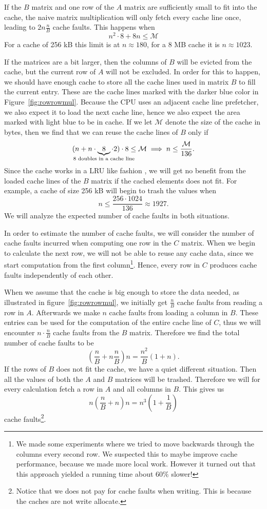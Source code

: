 If the $B$ matrix and one row of the $A$ matrix are sufficiently small
to fit into the cache, the naive matrix multiplication will only fetch
every cache line once, leading to $2n\frac{n}{B}$ cache faults. This
happens when
\[
n^2 \cdot 8 + 8n \leq \mathcal{M}
\]
For a cache of 256 kB this limit is at $n \approx 180$, for a 8 MB cache it is $n
\approx 1023$.

If the matrices are a bit larger, then the columns of $B$ will be
evicted from the cache, but the current row of $A$ will not be
excluded. In order for this to happen, we should have enough cache to
store all the cache lines used in matrix $B$ to fill the current
entry. These are the cache lines marked with the darker blue color in
Figure~\ref{fig:rowrowmul}. Because the CPU uses an adjacent cache
line prefetcher, we also expect it to load the next cache line, hence
we also expect the area marked with light blue to be in cache. If we
let $\mathcal{M}$ denote the size of the cache in bytes, then we find
that we can reuse the cache lines of $B$ only if
\[
( n + n \cdot \underbrace{8}_{\mathclap{8 \text{ doubles in a cache line}}} \cdot 2) \cdot 8 \leq \mathcal{M}
\implies
n \leq \frac{\mathcal{M}}{136}.
\]
Since the cache works in a LRU like fashion \citep[p. 117 - 121]{Hanne}, we will get no
benefit from the loaded cache lines of the $B$ matrix if the cached
elements does not fit. For example, a cache of size 256 kB
will begin to trash the values when
\[
n \leq \frac{256 \cdot 1024}{136} \approx 1927.
\]
We will analyze the expected number of cache faults in both situations.

In order to estimate the number of cache faults, we will consider the
number of cache faults incurred when computing one row in the $C$
matrix. When we begin to calculate the next row, we will not be able
to reuse any cache data, since we start computation from the first
column\footnote{We made some experiments where we tried to move
  backwards through the columns every second row. We suspected this to
  maybe improve cache performance, because we made more local
  work. However it turned out that this approach yielded a running
  time about $60\%$ slower!}. Hence, every row in $C$ produces cache
faults independently of each other.

When we assume that the cache is big enough to
store the data needed, as illustrated in figure~\ref{fig:rowrowmul},
we initially get $\frac{n}{B}$ cache faults from reading a row in $A$.
Afterwards we make $n$ cache faults from loading a column in
$B$. These entries can be used for the computation of the entire cache
line of $C$, thus we will encounter $n \cdot \frac{n}{B}$ cache
faults from the $B$ matrix. Therefore we find the total number of
cache faults to be
\[
\left( \frac{n}{B} + n \frac{n}{B} \right) n = \frac{n^2}{B} \left( 1 + n \right).
\]
If the rows of $B$ does not fit the cache, we have a quiet different
situation. Then all the values of both the $A$ and $B$ matrices will
be trashed. Therefore we will for every calculation fetch a row in $A$
and all columns in $B$. This gives us
\[
n\left( \frac{n}{B} + n \right) n = n^3 \left(1 + \frac{1}{B} \right)
\]
cache faults\footnote{Notice that we does not pay for cache faults
  when writing. This is because the caches are not write
  allocate.}.

